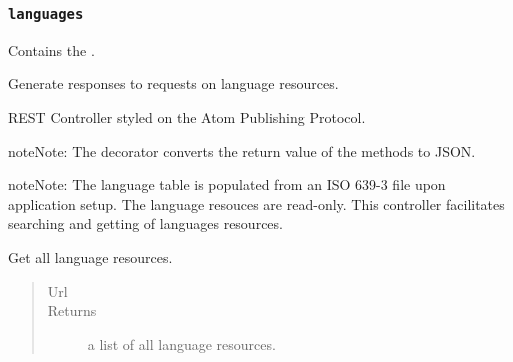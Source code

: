 \documentclass[letterpaper,10pt,english]{sphinxmanual}
\begin{document}
\subsubsection{\texttt{languages}}
\label{api:languages}\label{api:module-onlinelinguisticdatabase.controllers.languages}
Contains the {\hyperref[api:onlinelinguisticdatabase.controllers.languages.LanguagesController]{}}.
\label{api:module-languages}

\begin{fulllineitems}
\label{api:onlinelinguisticdatabase.controllers.languages.LanguagesController}
Generate responses to requests on language resources.

REST Controller styled on the Atom Publishing Protocol.

\begin{notice}{note}{Note:}
The  decorator converts the return value of the methods to
JSON.
\end{notice}

\begin{notice}{note}{Note:}
The language table is populated from an ISO 639-3 file upon application
setup.  The language resouces are read-only.  This controller
facilitates searching and getting of languages resources.
\end{notice}

\begin{fulllineitems}
\label{api:onlinelinguisticdatabase.controllers.languages.LanguagesController.index}
Get all language resources.
\begin{quote}\begin{description}
\item[{Url }] \leavevmode
{}

\item[{Returns}] \leavevmode
a list of all language resources.

\end{description}\end{quote}

\end{fulllineitems}


\end{fulllineitems}
\end{document}
